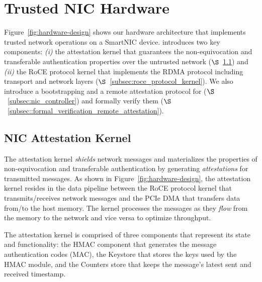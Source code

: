 

\section{Trusted NIC Hardware}
\label{sec:t-nic-hardware}
Figure~\ref{fig:hardware-design} shows our \projecttitle{} hardware architecture that implements trusted network operations on a SmartNIC device. \projecttitle{} introduces two key components: \emph{(i)} the attestation kernel that guarantees the non-equivocation and transferable authentication properties over the untrusted network ($\S$~\ref{subsec:nic_attest_kernel}) and \emph{(ii)} the RoCE protocol kernel that implements the RDMA protocol including transport and network layers ($\S$~\ref{subsec:roce_protocol_kernel}). We also introduce a bootstrapping and a remote attestation protocol for \projecttitle{} ($\S$~\ref{subsec:nic_controller}) and formally verify them ($\S$~\ref{subsec::formal_verification_remote_attestation}).

\subsection{NIC Attestation Kernel}
\label{subsec:nic_attest_kernel}
The attestation kernel {\em shields} network messages and materializes the properties of non-equivocation and transferable authentication by generating {\em attestations} for transmitted messages. As shown in Figure~\ref{fig:hardware-design}, the attestation kernel resides in the data pipeline between the RoCE protocol kernel that transmits/receives network messages and the PCIe DMA that transfers data from/to the host memory.
The kernel processes the messages as they {\em flow} from the memory to the network and vice versa to optimize throughput. 

 The attestation kernel is comprised of three components that represent its state and functionality: the HMAC component that generates the message authentication codes (MAC), the Keystore that stores the keys used by the HMAC module, and the Counters store that keeps the message's latest sent and received timestamp. 

